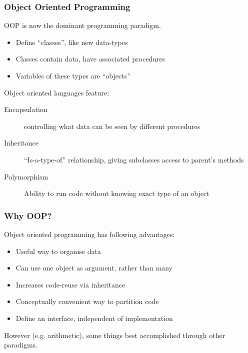 \documentclass[12pt]{beamer}
\begin{document}
\begin{frame}
  \frametitle{Object Oriented Programming}
  OOP is now the dominant programming paradigm.
  \begin{itemize}
  \item Define ``classes'', like new data-types
  \item Classes contain data, have associated procedures
  \item Variables of these types are ``objects''
  \end{itemize}
  
  \vspace{3mm}
  Object oriented languages feature:
  
  \begin{description}
  \item[Encapsulation] controlling what data can be seen by different
    procedures
  \item[Inheritance] ``Is-a-type-of'' relationship, giving subclasses
    access to parent's methods 
  \item[Polymorphism] Ability to run code without knowing exact type
    of an object
  \end{description}
\end{frame}

%     

\begin{frame}
  \frametitle{Why OOP?}
  Object oriented programming has following advantages:
  \begin{itemize}
  \item Useful way to organise data
  \item Can use one object as argument, rather than many
  \item Increases code-reuse via inheritance
  \item Conceptually convenient way to partition code
  \item Define an interface, independent of implementation
  \end{itemize}

  \vspace{3mm}
  However (e.g. arithmetic), some things best accomplished
  through other paradigms.
\end{frame}
\end{document}
